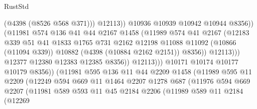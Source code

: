 \begin{lexlean}{RustStd}
\begin{coremodule}
                                        (@4398 (@8526 @568 @371)))
                                      @12113))
                                  @10936
                                  @10939
                                  @10942
                                  @10944
                                  @8356))
                              (@11981
                                @574
                                @136
                                @41
                                @44
                                @2167
                                @1458
                                (@11989
                                  @574
                                  @41
                                  @2167
                                  (@12183
                                    @339
                                    @51
                                    @41
                                    @1833
                                    @1765
                                    @731
                                    @2162
                                    @12198
                                    @11088
                                    @11092
                                    (@10866 (@11094 @339))
                                    @10882
                                    (@4398 (@10884 @2162 @2151))
                                    @8356))
                                @12113)))
                          @12377
                          @12380
                          @12383
                          @12385
                          @8356))
                      @12113)))
                @10171
                @10174
                @10177
                @10179
                @8356))
            (@11981
              @595
              @136
              @11
              @44
              @2209
              @1458
              (@11989
                @595
                @11
                @2209
                (@12249
                  @594
                  @669
                  @11
                  @1464
                  @2207
                  @1278
                  @687
                  (@11976
                    @594
                    @669
                    @2207
                    (@11981
                      @589
                      @593
                      @11
                      @45
                      @2184
                      @2206
                      (@11989
                        @589
                        @11
                        @2184
                        (@12269

\end{coremodule}
\end{lexlean}
